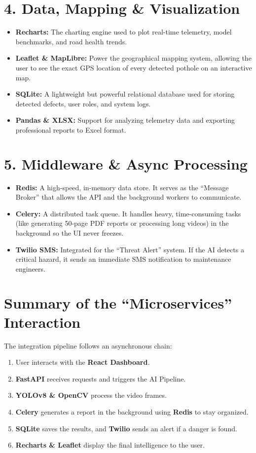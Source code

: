 \documentclass[12pt,a4paper]{report}
\begin{document}
\section{4. Data, Mapping \& Visualization}
\begin{itemize}
    \item \textbf{Recharts:} The charting engine used to plot real-time telemetry, model benchmarks, and road health trends.
    \item \textbf{Leaflet \& MapLibre:} Power the geographical mapping system, allowing the user to see the exact GPS location of every detected pothole on an interactive map.
    \item \textbf{SQLite:} A lightweight but powerful relational database used for storing detected defects, user roles, and system logs.
    \item \textbf{Pandas \& XLSX:} Support for analyzing telemetry data and exporting professional reports to Excel format.
\end{itemize}

\section{5. Middleware \& Async Processing}
\begin{itemize}
    \item \textbf{Redis:} A high-speed, in-memory data store. It serves as the ``Message Broker'' that allows the API and the background workers to communicate.
    \item \textbf{Celery:} A distributed task queue. It handles heavy, time-consuming tasks (like generating 50-page PDF reports or processing long videos) in the background so the UI never freezes.
    \item \textbf{Twilio SMS:} Integrated for the ``Threat Alert'' system. If the AI detects a critical hazard, it sends an immediate SMS notification to maintenance engineers.
\end{itemize}

\section{Summary of the ``Microservices'' Interaction}
The integration pipeline follows an asynchronous chain:
\begin{enumerate}
    \item User interacts with the \textbf{React Dashboard}.
    \item \textbf{FastAPI} receives requests and triggers the AI Pipeline.
    \item \textbf{YOLOv8 \& OpenCV} process the video frames.
    \item \textbf{Celery} generates a report in the background using \textbf{Redis} to stay organized.
    \item \textbf{SQLite} saves the results, and \textbf{Twilio} sends an alert if a danger is found.
    \item \textbf{Recharts \& Leaflet} display the final intelligence to the user.
\end{enumerate}
\end{document}
